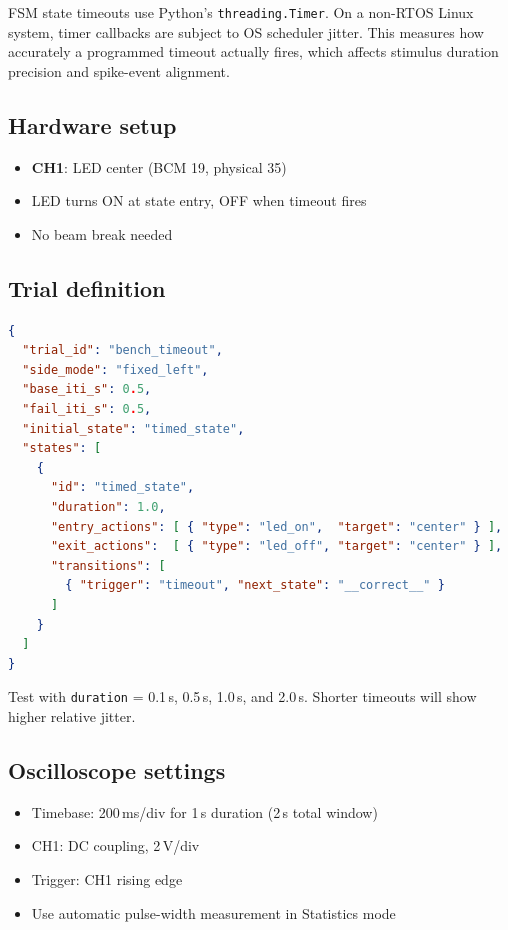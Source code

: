 \documentclass[11pt, a4paper]{article}
\begin{document}
FSM state timeouts use Python's \texttt{threading.Timer}. On a non-RTOS Linux
system, timer callbacks are subject to OS scheduler jitter. This measures how
accurately a programmed timeout actually fires, which affects stimulus duration
precision and spike-event alignment.

\subsection*{Hardware setup}

\begin{itemize}[noitemsep]
    \item \textbf{CH1}: LED center (BCM 19, physical 35)
    \item LED turns ON at state entry, OFF when timeout fires
    \item No beam break needed
\end{itemize}

\subsection*{Trial definition}

\begin{lstlisting}[language=json]
{
  "trial_id": "bench_timeout",
  "side_mode": "fixed_left",
  "base_iti_s": 0.5,
  "fail_iti_s": 0.5,
  "initial_state": "timed_state",
  "states": [
    {
      "id": "timed_state",
      "duration": 1.0,
      "entry_actions": [ { "type": "led_on",  "target": "center" } ],
      "exit_actions":  [ { "type": "led_off", "target": "center" } ],
      "transitions": [
        { "trigger": "timeout", "next_state": "__correct__" }
      ]
    }
  ]
}
\end{lstlisting}

Test with \texttt{duration} = 0.1\,s, 0.5\,s, 1.0\,s, and 2.0\,s.
Shorter timeouts will show higher relative jitter.

\subsection*{Oscilloscope settings}

\begin{itemize}[noitemsep]
    \item Timebase: 200\,ms/div for 1\,s duration (2\,s total window)
    \item CH1: DC coupling, 2\,V/div
    \item Trigger: CH1 rising edge
    \item Use automatic pulse-width measurement in Statistics mode
\end{itemize}
\end{document}

